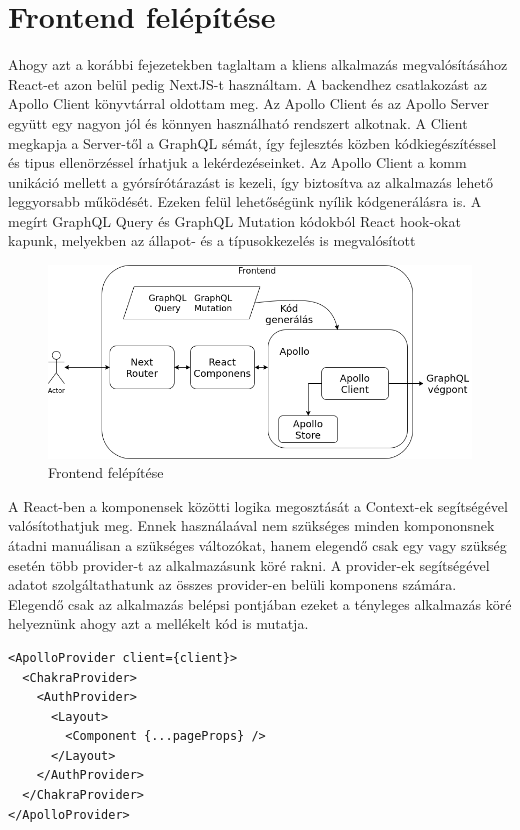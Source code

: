 
\section{Frontend felépítése}

Ahogy azt a korábbi fejezetekben taglaltam a kliens alkalmazás megvalósításához React-et azon belül pedig NextJS-t használtam.
A backendhez csatlakozást az Apollo Client könyvtárral oldottam meg. 
Az Apollo Client és az Apollo Server együtt egy nagyon jól és könnyen használható rendszert alkotnak.
A Client megkapja a Server-től a GraphQL sémát, így fejlesztés közben kódkiegészítéssel és tipus ellenörzéssel írhatjuk a lekérdezéseinket.
Az Apollo Client a komm unikáció mellett a gyórsírótárazást is kezeli, így biztosítva az alkalmazás lehető leggyorsabb működését.
Ezeken felül lehetőségünk nyílik kódgenerálásra is.
A megírt GraphQL Query és GraphQL Mutation kódokból React hook-okat kapunk, melyekben az állapot- és a típusokkezelés is megvalósított

\begin{figure}[!ht]
  \centering
  \includegraphics[width=150mm, keepaspectratio]{figures/frontend.png}
  \caption{Frontend felépítése}
  \label{fig:frontend}
\end{figure}

A React-ben a komponensek közötti logika megosztását a Context-ek segítségével valósítothatjuk meg.
Ennek használaával nem szükséges minden kompononsnek átadni manuálisan a szükséges változókat, hanem elegendő csak egy vagy szükség esetén több provider-t az alkalmazásunk köré rakni.
A provider-ek segítségével adatot szolgáltathatunk az összes provider-en belüli komponens számára.
Elegendő csak az alkalmazás belépsi pontjában ezeket a tényleges alkalmazás köré helyeznünk ahogy azt a mellékelt kód is mutatja.

\begin{lstlisting}[style=ES6, caption=Frontend-hez használt provider-ek]    
<ApolloProvider client={client}>
  <ChakraProvider>
    <AuthProvider>
      <Layout>
        <Component {...pageProps} />
      </Layout>
    </AuthProvider>
  </ChakraProvider>
</ApolloProvider>
\end{lstlisting}

